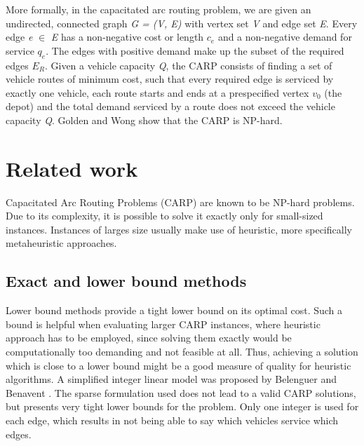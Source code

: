 \documentclass[oneside]{ctuthesis}
\theoremstyle{plain}
\theoremstyle{definition}
\theoremstyle{note}
\begin{document}
More formally, in the capacitated arc routing problem, we are given an undirected, connected graph \emph{G = (V, E)} with vertex set
\emph{V} and edge set \emph{E}. Every edge \emph{e} $\in$ \emph{E} has a non-negative cost or length \emph{$ c_e $} and a non-negative
demand for service \emph{$ q_e $}. The edges with positive
demand make up the subset of the required edges
\emph{$ E_R $}. Given a vehicle capacity \emph{Q}, the CARP consists
of finding a set of vehicle routes of minimum cost,
such that every required edge is serviced by exactly
one vehicle, each route starts and ends at a prespecified vertex \emph{$ v_0 $} (the depot) and the total
demand serviced by a route does not exceed the
vehicle capacity \emph{Q}. Golden and Wong \cite{golden1981capacitated} show
that the CARP is NP-hard. 


\chapter{Related work}

Capacitated Arc Routing Problems (CARP) are known to be NP-hard problems. Due to its complexity, it is possible to solve it exactly only for small-sized instances. Instances of larges size usually make use of heuristic, more specifically metaheuristic approaches.

\section{Exact and lower bound methods}
Lower bound methods provide a tight lower bound on its optimal cost. Such a bound is helpful when evaluating larger CARP instances, where heuristic approach has to be employed, since solving them exactly would be computationally too demanding and not feasible at all. Thus, achieving a solution which is close to a lower bound might be a good measure of quality for heuristic algorithms.
A simplified integer linear model was proposed by Belenguer and Benavent \cite{BELENGUER2003705}. The sparse formulation used does not lead to a valid CARP solutions, but presents very tight lower bounds for the problem. Only one integer is used for each edge, which results in not being able to say which vehicles service which edges.
\end{document}
